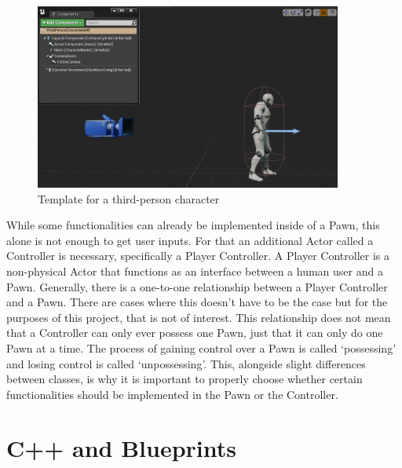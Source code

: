 \begin{figure}[htpb]
	\centering
	\includegraphics[width=0.9\textwidth]{fig/UnrealCharacter.png}
	\caption[Template for third person character]{Template for a third-person character\protect}
	\label{fig:UnrealCharacter}
\end{figure}

While some functionalities can already be implemented inside of a Pawn, this alone is not enough to get user inputs. For that an additional Actor called a Controller is necessary, specifically a Player Controller. A Player Controller is a non-physical Actor that functions as an interface between a human user and a Pawn\cite{bib:UEControllers}. Generally, there is a one-to-one relationship between a Player Controller and a Pawn. There are cases where this doesn't have to be the case but for the purposes of this project, that is not of interest. This relationship does not mean that a Controller can only ever possess one Pawn, just that it can only do one Pawn at a time. The process of gaining control over a Pawn is called `possessing' and losing control is called `unpossessing'. This, alongside slight differences between classes, is why it is important to properly choose whether certain functionalities should be implemented in the Pawn or the Controller.

\section{C++ and Blueprints}


